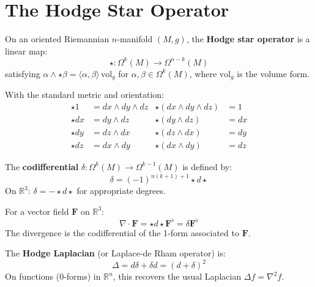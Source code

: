 \section{The Hodge Star Operator}

\begin{definition}
    On an oriented Riemannian $n$-manifold $(M, g)$, the \textbf{Hodge star operator} is a linear map:
    \[
        \star: \Omega^k(M) \to \Omega^{n-k}(M)
    \]
    satisfying $\alpha \wedge \star\beta = \langle \alpha, \beta \rangle \, \mathrm{vol}_g$ for $\alpha, \beta \in \Omega^k(M)$, where $\mathrm{vol}_g$ is the volume form.
\end{definition}

\begin{example}
    With the standard metric and orientation:
    \begin{align*}
        \star 1  & = dx \wedge dy \wedge dz & \star(dx \wedge dy \wedge dz) & = 1  \\
        \star dx & = dy \wedge dz           & \star(dy \wedge dz)           & = dx \\
        \star dy & = dz \wedge dx           & \star(dz \wedge dx)           & = dy \\
        \star dz & = dx \wedge dy           & \star(dx \wedge dy)           & = dz
    \end{align*}
\end{example}

\begin{definition}[Codifferential]
    The \textbf{codifferential} $\delta: \Omega^k(M) \to \Omega^{k-1}(M)$ is defined by:
    \[
        \delta = (-1)^{n(k+1)+1} \star d \star
    \]
    On $\mathbb{R}^3$: $\delta = -\star d \star$ for appropriate degrees.
\end{definition}

\begin{proposition}
    For a vector field $\mathbf{F}$ on $\mathbb{R}^3$:
    \[
        \nabla \cdot \mathbf{F} = \star d \star \mathbf{F}^\flat = \delta \mathbf{F}^\flat
    \]
    The divergence is the codifferential of the 1-form associated to $\mathbf{F}$.
\end{proposition}

\begin{definition}
    The \textbf{Hodge Laplacian} (or Laplace-de Rham operator) is:
    \[
        \Delta = d\delta + \delta d = (d + \delta)^2
    \]
    On functions (0-forms) in $\mathbb{R}^n$, this recovers the usual Laplacian $\Delta f = \nabla^2 f$.
\end{definition}

